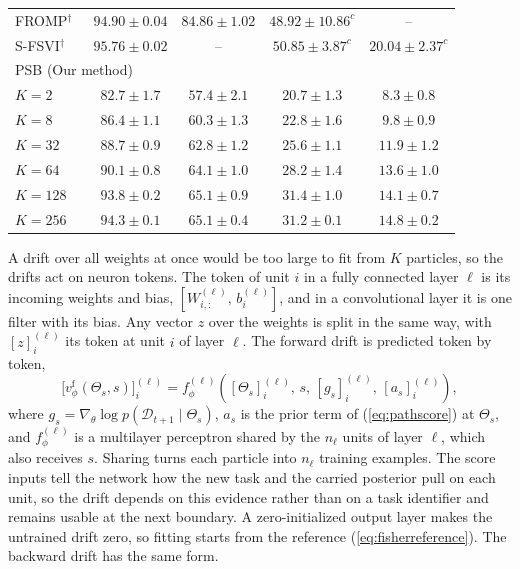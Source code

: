 \documentclass{article}
\begin{document}
\begin{table}[t]
\begin{tabular*}{\textwidth}{@{\extracolsep{\fill}}lcccc@{}}
  FROMP$^\dagger$~\cite{pan2020fromp,rudner2022sfsvi,vandeven2022types,kessler2023sequential}
      & $94.90\pm0.04$ & $84.86\pm1.02$
      & $48.92\pm10.86^{c}$ & -- \\
  S-FSVI$^\dagger$~\cite{rudner2022sfsvi,kessler2023sequential}
      & $95.76\pm0.02$ & --
      & $50.85\pm3.87^{c}$ & $20.04\pm2.37^{c}$ \\
  \hline
  \multicolumn{5}{l}{PSB (Our method)} \\
  $K=2$   & $82.7\pm1.7$ & $57.4\pm2.1$
          & $20.7\pm1.3$ & $8.3\pm0.8$ \\
  $K=8$   & $86.4\pm1.1$ & $60.3\pm1.3$
          & $22.8\pm1.6$ & $9.8\pm0.9$ \\
  $K=32$  & $88.7\pm0.9$ & $62.8\pm1.2$
          & $25.6\pm1.1$ & $11.9\pm1.2$ \\
  $K=64$  & $90.1\pm0.8$ & $64.1\pm1.0$
          & $28.2\pm1.4$ & $13.6\pm1.0$ \\
  $K=128$ & $93.8\pm0.2$ & $65.1\pm0.9$
          & $31.4\pm1.0$ & $14.1\pm0.7$ \\
  $K=256$ & $94.3\pm0.1$ & $65.1\pm0.4$
          & $31.2\pm0.1$ & $14.8\pm0.2$ \\
  \hline
  \end{tabular*}
\end{table}

A drift over all weights at once would be too large to fit from $K$ particles,
so the drifts act on neuron tokens. The token of unit $i$ in a fully connected
layer $\ell$ is its incoming weights and bias,
$[W^{(\ell)}_{i,:},\,b^{(\ell)}_i]$, and in a convolutional layer it is one
filter with its bias. Any vector $z$ over the weights is split in the same way,
with $[z]^{(\ell)}_i$ its token at unit $i$ of layer $\ell$. The forward drift is
predicted token by token,
\begin{equation}
    \big[v^{\mathrm{f}}_\phi(\Theta_s,s)\big]^{(\ell)}_i
    =f^{(\ell)}_\phi\!\left([\Theta_s]^{(\ell)}_i,\,s,\,[g_s]^{(\ell)}_i,\,
    [a_s]^{(\ell)}_i\right),
    \label{eq:tokendrift}
\end{equation}
where $g_s=\nabla_\theta\log p(\mathcal{D}_{t+1}\mid\Theta_s)$, $a_s$ is the
prior term of (\ref{eq:pathscore}) at $\Theta_s$, and $f^{(\ell)}_\phi$ is a
multilayer perceptron shared by the $n_\ell$ units of layer $\ell$, which also
receives $s$. Sharing turns each particle into $n_\ell$ training examples. The
score inputs tell the network how the new task and the carried posterior pull on
each unit, so the drift depends on this evidence rather than on a task
identifier and remains usable at the next boundary. A zero-initialized output
layer makes the untrained drift zero, so fitting starts from the reference
(\ref{eq:fisherreference}). The backward drift has the same form.
\end{document}
